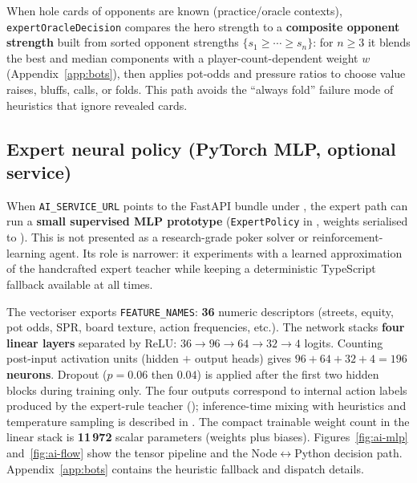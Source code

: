 \documentclass[11pt,a4paper]{article}
\begin{document}
When hole cards of opponents are known (practice/oracle contexts), \texttt{expertOracleDecision} compares the hero strength to a \textbf{composite opponent strength} built from sorted opponent strengths $\{s_1\ge\cdots\ge s_n\}$: for $n\ge 3$ it blends the best and median components with a player-count-dependent weight $w$ (Appendix~\ref{app:bots}), then applies pot-odds and pressure ratios to choose value raises, bluffs, calls, or folds. This path avoids the ``always fold'' failure mode of heuristics that ignore revealed cards.

\subsection{Expert neural policy (PyTorch MLP, optional service)}

When \texttt{AI\_SERVICE\_URL} points to the FastAPI bundle under , the expert path can run a \textbf{small supervised MLP prototype} (\texttt{ExpertPolicy} in , weights serialised to ). This is not presented as a research-grade poker solver or reinforcement-learning agent. Its role is narrower: it experiments with a learned approximation of the handcrafted expert teacher while keeping a deterministic TypeScript fallback available at all times.

The vectoriser  exports \texttt{FEATURE\_NAMES}: \textbf{36} numeric descriptors (streets, equity, pot odds, SPR, board texture, action frequencies, etc.). The network stacks \textbf{four linear layers} separated by ReLU: $36\to 96 \to 64 \to 32 \to 4$ logits. Counting post-input activation units (hidden $+$ output heads) gives \textbf{$96+64+32+4=196$ neurons}. Dropout ($p{=}0.06$ then $0.04$) is applied after the first two hidden blocks during training only. The four outputs correspond to internal action labels produced by the expert-rule teacher (); inference-time mixing with heuristics and temperature sampling is described in . The compact trainable weight count in the linear stack is \textbf{11\,972} scalar parameters (weights plus biases). Figures~\ref{fig:ai-mlp} and~\ref{fig:ai-flow} show the tensor pipeline and the Node$\leftrightarrow$Python decision path. Appendix~\ref{app:bots} contains the heuristic fallback and dispatch details.
\end{document}
